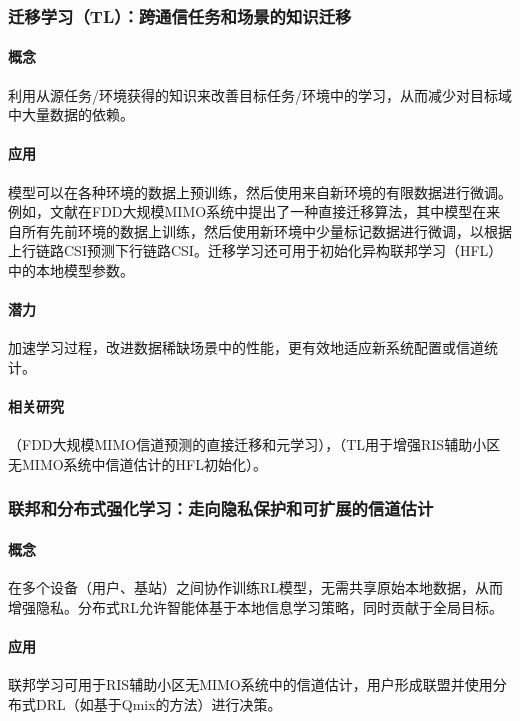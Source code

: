 \documentclass[journal]{IEEEtran}
\begin{document}
\subsubsection{迁移学习（TL）：跨通信任务和场景的知识迁移}

\paragraph{概念} 
利用从源任务/环境获得的知识来改善目标任务/环境中的学习，从而减少对目标域中大量数据的依赖\cite{ref8}。

\paragraph{应用} 
模型可以在各种环境的数据上预训练，然后使用来自新环境的有限数据进行微调\cite{ref54}。例如，文献\cite{ref54}在FDD大规模MIMO系统中提出了一种直接迁移算法，其中模型在来自所有先前环境的数据上训练，然后使用新环境中少量标记数据进行微调，以根据上行链路CSI预测下行链路CSI。迁移学习还可用于初始化异构联邦学习（HFL）中的本地模型参数\cite{ref55}。

\paragraph{潜力} 
加速学习过程，改进数据稀缺场景中的性能，更有效地适应新系统配置或信道统计。

\paragraph{相关研究} 
\cite{ref54}（FDD大规模MIMO信道预测的直接迁移和元学习），\cite{ref55}（TL用于增强RIS辅助小区无MIMO系统中信道估计的HFL初始化）。

\subsubsection{联邦和分布式强化学习：走向隐私保护和可扩展的信道估计}

\paragraph{概念} 
在多个设备（用户、基站）之间协作训练RL模型，无需共享原始本地数据，从而增强隐私\cite{ref4}。分布式RL允许智能体基于本地信息学习策略，同时贡献于全局目标。

\paragraph{应用} 
联邦学习可用于RIS辅助小区无MIMO系统中的信道估计，用户形成联盟并使用分布式DRL（如基于Qmix的方法）进行决策\cite{ref55}。
\end{document}
